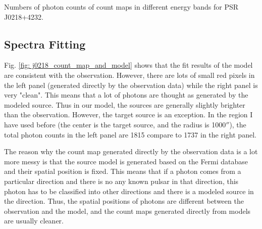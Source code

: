 \documentclass[12pt]{report}
\newcommand{\mycaption}[1]{\protect \caption{#1}}
\begin{document}
          \begin{table}[!h]   
            \centering
            \mycaption{Numbers of photon counts of count maps in different energy bands for 
                  PSR J0218+4232.}
            \label{table:j0218_ccube_photon_counts}
          \end{table}
          \subsection{Spectra Fitting}
            Fig. \ref{fig: j0218_count_map_and_model} shows that the fit results of the model 
            are consistent with the observation. However, there are lots of small red pixels 
            in the left panel (generated directly by the observation data) while the 
            right panel is very "clean". This means that a lot of photons are thought as 
            generated by the modeled source. Thus in our model, the sources are generally 
            slightly brighter than the observation. However, the target
            source is an exception. In the region I have used before (the center is the 
            target source, and the radius is 1000$''$), the total photon counts in the left 
            panel are 1815 compare to 1737 in the right panel. 

            The reason why the count map generated directly by the observation data is a lot 
            more messy is that the source model is generated based on the Fermi database 
            and their spatial position is fixed. This means that if 
            a photon comes from a particular direction and there is no any known pulsar in 
            that direction, this photon has to be classified into other directions and there 
            is a modeled source in the direction.  Thus, the spatial positions of photons are 
            different between the observation and the model, and the count maps generated 
            directly from models are usually cleaner. 
            
\end{document}
